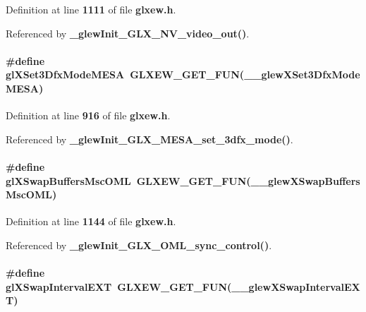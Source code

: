 Definition at line {\bf 1111} of file {\bf glxew.\+h}.



Referenced by {\bf \+\_\+glew\+Init\+\_\+\+G\+L\+X\+\_\+\+N\+V\+\_\+video\+\_\+out()}.

\paragraph[{gl\+X\+Set3\+Dfx\+Mode\+M\+E\+SA}]{\setlength{\rightskip}{0pt plus 5cm}\#define gl\+X\+Set3\+Dfx\+Mode\+M\+E\+SA~{\bf G\+L\+X\+E\+W\+\_\+\+G\+E\+T\+\_\+\+F\+UN}({\bf \+\_\+\+\_\+glew\+X\+Set3\+Dfx\+Mode\+M\+E\+SA})}\label{glxew_8h_ad10f8837fa95d126368d68bec83decd0}


Definition at line {\bf 916} of file {\bf glxew.\+h}.



Referenced by {\bf \+\_\+glew\+Init\+\_\+\+G\+L\+X\+\_\+\+M\+E\+S\+A\+\_\+set\+\_\+3dfx\+\_\+mode()}.

\paragraph[{gl\+X\+Swap\+Buffers\+Msc\+O\+ML}]{\setlength{\rightskip}{0pt plus 5cm}\#define gl\+X\+Swap\+Buffers\+Msc\+O\+ML~{\bf G\+L\+X\+E\+W\+\_\+\+G\+E\+T\+\_\+\+F\+UN}({\bf \+\_\+\+\_\+glew\+X\+Swap\+Buffers\+Msc\+O\+ML})}\label{glxew_8h_ad5940c57b590cc0bfef2082bf9e10c0e}


Definition at line {\bf 1144} of file {\bf glxew.\+h}.



Referenced by {\bf \+\_\+glew\+Init\+\_\+\+G\+L\+X\+\_\+\+O\+M\+L\+\_\+sync\+\_\+control()}.

\paragraph[{gl\+X\+Swap\+Interval\+E\+XT}]{\setlength{\rightskip}{0pt plus 5cm}\#define gl\+X\+Swap\+Interval\+E\+XT~{\bf G\+L\+X\+E\+W\+\_\+\+G\+E\+T\+\_\+\+F\+UN}({\bf \+\_\+\+\_\+glew\+X\+Swap\+Interval\+E\+XT})}\label{glxew_8h_a44370466816fdf575153176149d87b7d}


